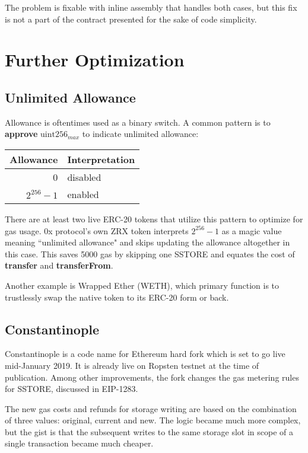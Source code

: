 \documentclass[12pt]{article}
\begin{document}
The problem is fixable with inline assembly that handles both cases, but this fix is not a part of the contract presented for the sake of code simplicity.


\section{Further Optimization}

\subsection{Unlimited Allowance}
Allowance is oftentimes used as a binary switch.
A common pattern is to \textbf{approve} $\text{uint256}_{max}$ to indicate unlimited allowance:

\begin{center}	
\begin{tabular}{r l}
	Allowance & Interpretation \\ \hline
	0 & disabled \\
	$2^{256}-1$ & enabled
\end{tabular}
\end{center}

There are at least two live ERC-20 tokens that utilize this pattern to optimize for gas usage.
0x protocol's own ZRX token interprets $2^{256}-1$ as a magic value meaning ``unlimited allowance" and skips updating the allowance altogether in this case\cite{zrx-unlimited}. This saves 5000 gas by skipping one SSTORE and equates the cost of \textbf{transfer} and \textbf{transferFrom}.

Another example is Wrapped Ether (WETH), which primary function is to trustlessly swap the native token to its ERC-20 form or back.

\subsection{Constantinople}

Constantinople is a code name for Ethereum hard fork which is set to go live mid-January 2019.
It is already live on Ropsten testnet at the time of publication.
Among other improvements, the fork changes the gas metering rules for SSTORE,
discussed in EIP-1283\cite{eip1283}.

The new gas costs and refunds for storage writing are based on the combination of three values: original, current and new.
The logic became much more complex, but the gist is that the subsequent writes to the same storage slot in scope of a single transaction became much cheaper.
\end{document}
